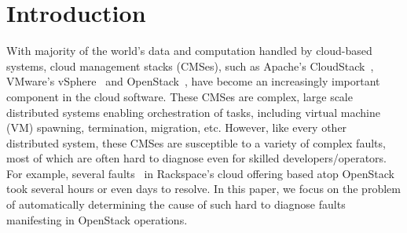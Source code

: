 \section{Introduction}
\label{sec:introduction}

With majority of the world's data and computation handled by cloud-based
systems, cloud management stacks (CMSes), such as Apache's
CloudStack~\cite{cloudstack}, VMware's vSphere~\cite{vsphere} and
OpenStack~\cite{os}, have become an increasingly important component in the cloud
software. These CMSes are complex, large scale distributed systems enabling
orchestration of tasks, including virtual machine (VM) spawning, termination,
migration, etc. However, like every other distributed system, these CMSes are
susceptible to a variety of complex faults, most of which are often hard to
diagnose even for skilled developers/operators. For example, several
faults~\cite{rackspace-1, rackspace-2, rackspace-3} in Rackspace's cloud
offering based atop OpenStack took several hours or even days to resolve. In this
paper, we focus on the problem of automatically determining the cause of such
hard to diagnose faults manifesting in OpenStack operations.
